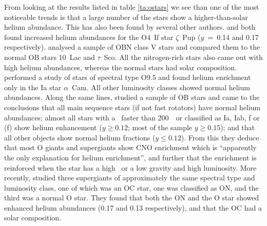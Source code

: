 From looking at the results listed in table \ref{ta:ostars} we see
than one of the most noticeable trends is that a large number of the
stars show a higher-than-solar helium abundance. This has also been
found by several other authors.  and  both
found increased helium abundances for the O4~If star $\zeta$~Pup
($y$~=~0.14 and 0.17 respectively).  analysed a sample
of OBN class V stars and compared them to the normal OB stars 10~Lac
and $\tau$~Sco. All the nitrogen-rich stars also came out with high
helium abundances, whereas the normal stars had solar
composition.  performed a study of stars of spectral
type O9.5 and found helium enrichment only in the Ia star
$\alpha$~Cam. All other luminosity classes showed normal helium
abundances. Along the same lines,  studied a sample of
OB stars and came to the conclusions that all main sequence stars (if
not fast rotators) have normal helium abundances; almost all stars
with a \vsini\ faster than 200~\kms\ or classified as Ia, Iab, f or
(f) show helium enhancement ($y \geq 0.12$; most of the sample $y \geq
0.15$); and that all other objects show normal helium fractions ($y
\leq 0.12$). From this they deduce that most O giants and supergiants
show CNO enrichment which is ``apparently the only explanation for
helium enrichment'', and further that the enrichment is reinforced
when the star has a high
\vsini\ or a low gravity and high luminosity. More recently,
 studied three supergiants of approximately the same spectral
type and luminosity class, one of which was an OC star, one was
classified as ON, and the third was a normal O star. They found that
both the ON and the O star showed enhanced helium abundances (0.17 and
0.13 respectively), and that the OC had a solar composition.


